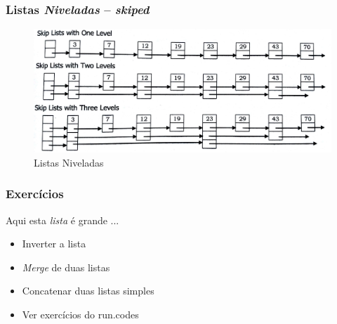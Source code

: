 
\begin{frame}%

\frametitle{Listas \textit{Niveladas} -- \textit{skiped}}

\begin{figure}[!hb]
	\centering
	\includegraphics[height=0.50\paperheight, width=0.7\paperwidth]{figs/fig_listas/skipped_listas.jpg}						
			\caption{Listas Niveladas}	
		\end{figure} 

\end{frame} 


\begin{frame}%

\frametitle{Exercícios}

\begin{block}{Aqui esta \textit{lista} é grande ... }

\begin{itemize}
  \item Inverter a lista
  \item \textit{Merge} de duas listas
  \item Concatenar duas listas simples
  \item Ver exercícios do run.codes
  
  
  
\end{itemize}


\end{block}


\end{frame} 

